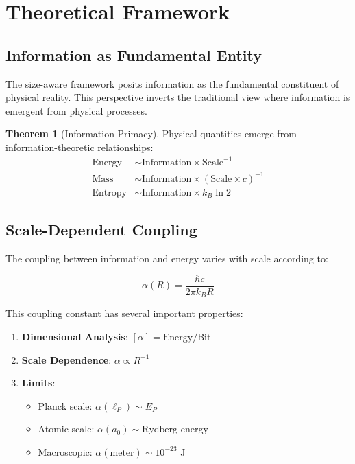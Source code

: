 \documentclass[11pt,a4paper]{article}
\theoremstyle{definition}
\newtheorem{theorem}{Theorem}[section]
\begin{document}
\section{Theoretical Framework}

\subsection{Information as Fundamental Entity}

The size-aware framework posits information as the fundamental constituent of physical reality. This perspective inverts the traditional view where information is emergent from physical processes.

\begin{theorem}[Information Primacy]
Physical quantities emerge from information-theoretic relationships:
\begin{align}
\text{Energy} &\sim \text{Information} \times \text{Scale}^{-1} \\
\text{Mass} &\sim \text{Information} \times (\text{Scale} \times c)^{-1} \\
\text{Entropy} &\sim \text{Information} \times k_B \ln 2
\end{align}
\end{theorem}

\subsection{Scale-Dependent Coupling}

The coupling between information and energy varies with scale according to:

\begin{equation}
\alpha(R) = \frac{\hbar c}{2\pi k_B R}
\end{equation}

This coupling constant has several important properties:

\begin{enumerate}
\item \textbf{Dimensional Analysis}: $[\alpha] = \text{Energy/Bit}$
\item \textbf{Scale Dependence}: $\alpha \propto R^{-1}$
\item \textbf{Limits}:
    \begin{itemize}
    \item Planck scale: $\alpha(\ell_P) \sim E_P$
    \item Atomic scale: $\alpha(a_0) \sim \text{Rydberg energy}$
    \item Macroscopic: $\alpha(\text{meter}) \sim 10^{-23}$ J
    \end{itemize}
\end{enumerate}
\end{document}
